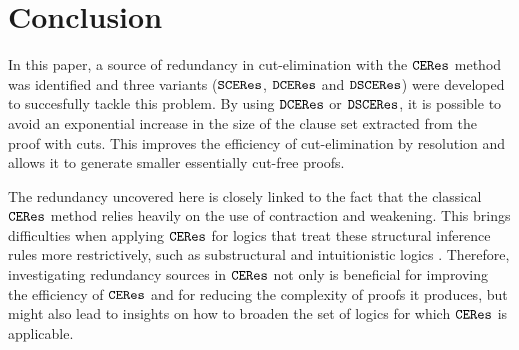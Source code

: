 \section{Conclusion}
\label{sec:Conclusion}

In this paper, a source of redundancy in cut-elimination with the $\texttt{CERes}$
method was identified and three variants ($\texttt{SCERes}$, $\texttt{DCERes}$ and
$\texttt{DSCERes}$) were developed to succesfully tackle this problem. By using
$\texttt{DCERes}$ or $\texttt{DSCERes}$, it is possible to avoid an exponential increase in
the size of the clause set extracted from the proof with cuts. This improves
the efficiency of cut-elimination by resolution and allows it to generate
smaller essentially cut-free proofs.

The redundancy uncovered here is closely linked to the fact that the classical
$\texttt{CERes}$ method relies heavily on the use of contraction and weakening. This
brings difficulties when applying $\texttt{CERes}$ for logics that treat these
structural inference rules more restrictively, such as substructural and
intuitionistic logics \cite{WoltzenlogelPaleo20012iCERes}. Therefore,
investigating redundancy sources in $\texttt{CERes}$ not only is beneficial for
improving the efficiency of $\texttt{CERes}$ and for reducing the complexity of proofs
it produces, but might also lead to insights on how to broaden the set of logics
for which $\texttt{CERes}$ is applicable.
